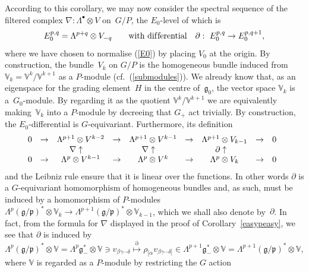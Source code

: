 \documentclass[11pt]{article}
\begin{document}
According to this corollary, we may now consider the spectral sequence of the
f\/iltered complex $\nabla:\Lambda^\bullet\otimes V$ on~$G/P$, the $E_0$-level
of which is
\begin{equation}\label{E0pq}
E_0^{p,q}=\Lambda^{p+q}\otimes V_{-q}\qquad\mbox{with dif\/ferential}\quad
\partial: \ E_0^{p,q}\to E_0^{p,q+1},\end{equation}
where we have chosen to normalise (\ref{E0}) by placing $V_0$ at the origin. By
construction, the bundle~$V_k$ on $G/P$ is the homogeneous bundle induced from
${\mathbb{V}}_k={\mathbb{V}}^k/{\mathbb{V}}^{k+1}$ as a $P$-module
(cf.~(\ref{submodules})). We already know that, as an eigenspace for the
grading element~$H$ in the centre of~${\mathfrak{g}}_0$, the vector space
${\mathbb{V}}_k$ is a~$G_0$-module. By regarding it as the quotient
${\mathbb{V}}^k/{\mathbb{V}}^{k+1}$ we are equivalently making~${\mathbb{V}}_k$
into a $P$-module by decreeing that $G_+$ act trivially. By construction, the
$E_0$-dif\/ferential is $G$-equivariant. Furthermore, its def\/inition
\[\begin{array}{@{}ccccccccc}
0&\to&\Lambda^{p+1}\otimes V^{k-2}&\to&\Lambda^{p+1}\otimes V^{k-1}&\to&
\Lambda^{p+1}\otimes V_{k-1}&\to&0\\
&&\nabla\uparrow\phantom{\nabla}&&\nabla\uparrow\phantom{\nabla}&&
\partial\uparrow\phantom{\partial}\\
0&\to&\Lambda^p\otimes V^{k-1}&\to&\Lambda^p\otimes V^k&\to&
\Lambda^p\otimes V_k&\to&0
\end{array}\]
and the Leibniz rule ensure that it is linear over the functions. In other
words $\partial$ is a $G$-equivariant homomorphism of homogeneous bundles and,
as such, must be induced by a homomorphism of $P$-modules
$\Lambda^p({\mathfrak{g}}/{\mathfrak{p}})^*\otimes{\mathbb{V}}_k\to
\Lambda^{p+1}({\mathfrak{g}}/{\mathfrak{p}})^*\otimes{\mathbb{V}}_{k-1}$, which
we shall also denote by~$\partial$. In fact, from the formula for $\nabla$
displayed in the proof of Corollary~\ref{easypeasy}, we see that $\partial$ is
induced by
\begin{equation}\label{E0differential}
\Lambda^p({\mathfrak{g}}/{\mathfrak{p}})^*\otimes{\mathbb{V}}=
\Lambda^p{\mathfrak{g}}_-^*\otimes{\mathbb{V}}
\ni v_{\beta\gamma\cdots\delta}\stackrel{\partial}{\longmapsto}
\rho_{[\alpha}v_{\beta\gamma\cdots\delta]}\in
\Lambda^{p+1}{\mathfrak{g}}_-^*\otimes{\mathbb{V}}=
\Lambda^{p+1}({\mathfrak{g}}/{\mathfrak{p}})^*\otimes{\mathbb{V}},
\end{equation}
where ${\mathbb{V}}$ is regarded as a $P$-module by restricting the $G$ action
\end{document}
